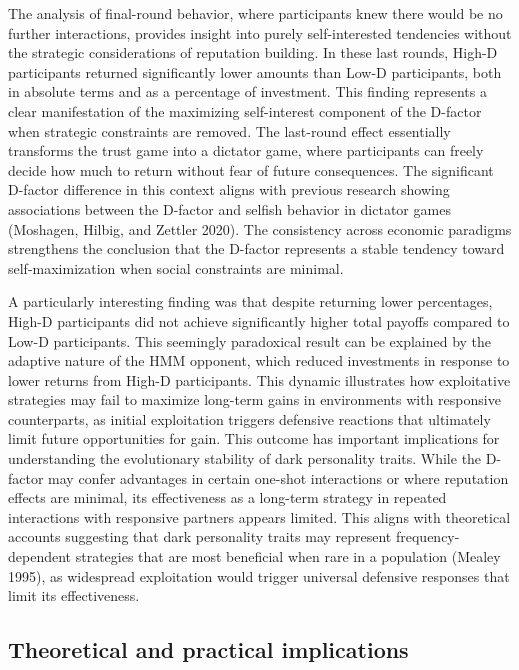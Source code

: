 \documentclass[
]{article}
\begin{document}
The analysis of final-round behavior, where participants knew there would be no further interactions, provides insight into purely self-interested tendencies without the strategic considerations of reputation building. In these last rounds, High-D participants returned significantly lower amounts than Low-D participants, both in absolute terms and as a percentage of investment. This finding represents a clear manifestation of the maximizing self-interest component of the D-factor when strategic constraints are removed.
The last-round effect essentially transforms the trust game into a dictator game, where participants can freely decide how much to return without fear of future consequences. The significant D-factor difference in this context aligns with previous research showing associations between the D-factor and selfish behavior in dictator games (Moshagen, Hilbig, and Zettler 2020). The consistency across economic paradigms strengthens the conclusion that the D-factor represents a stable tendency toward self-maximization when social constraints are minimal.

A particularly interesting finding was that despite returning lower percentages, High-D participants did not achieve significantly higher total payoffs compared to Low-D participants. This seemingly paradoxical result can be explained by the adaptive nature of the HMM opponent, which reduced investments in response to lower returns from High-D participants. This dynamic illustrates how exploitative strategies may fail to maximize long-term gains in environments with responsive counterparts, as initial exploitation triggers defensive reactions that ultimately limit future opportunities for gain.
This outcome has important implications for understanding the evolutionary stability of dark personality traits. While the D-factor may confer advantages in certain one-shot interactions or where reputation effects are minimal, its effectiveness as a long-term strategy in repeated interactions with responsive partners appears limited. This aligns with theoretical accounts suggesting that dark personality traits may represent frequency-dependent strategies that are most beneficial when rare in a population (Mealey 1995), as widespread exploitation would trigger universal defensive responses that limit its effectiveness.

\subsection{Theoretical and practical implications}\label{theoretical-and-practical-implications}
\end{document}
